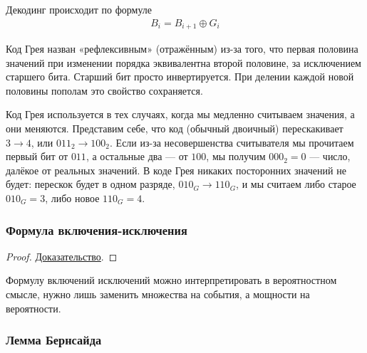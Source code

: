 \documentclass{article}
\begin{document}
Декодинг происходит по формуле 
\begin{align*}
	B_i = B_{i + 1} \oplus G_i
\end{align*}

Код Грея назван «рефлексивным» (отражённым) из-за того, что первая половина значений при изменении порядка эквивалентна второй половине, за исключением старшего бита. Старший бит просто инвертируется. При делении каждой новой половины пополам это свойство сохраняется.

Код Грея используется в тех случаях, когда мы медленно считываем значения, а они меняются. Представим себе, что код (обычный двоичный) перескакивает $3\rightarrow4$, или $011_2 \rightarrow 100_2$. Если из-за несовершенства считывателя мы прочитаем первый бит от $011$, а остальные два — от $100$, мы получим $000_2=0$ — число, далёкое от реальных значений. В коде Грея никаких посторонних значений не будет: перескок будет в одном разряде, $010_G \rightarrow 110_G$, и мы считаем либо старое $010_G=3$, либо новое $110_G=4$. 

\subsubsection{Формула включения-исключения}

\begin{proof}
	\href{https://neerc.ifmo.ru/wiki/index.php?title=%D0%A4%D0%BE%D1%80%D0%BC%D1%83%D0%BB%D0%B0_%D0%B2%D0%BA%D0%BB%D1%8E%D1%87%D0%B5%D0%BD%D0%B8%D1%8F-%D0%B8%D1%81%D0%BA%D0%BB%D1%8E%D1%87%D0%B5%D0%BD%D0%B8%D1%8F}{Доказательство}.
\end{proof}

Формулу включений исключений можно интерпретировать в вероятностном смысле, нужно лишь заменить множества на события, а мощности на вероятности. 

\subsubsection{Лемма Бернсайда}

\end{document}
